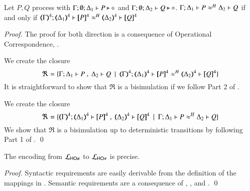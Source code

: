 \begin{proposition}\rm
	\label{prop:fulla:pHOp_to_HOp}
	Let $P, Q$ \pHOp process with $\Gamma; \emptyset; \Delta_1 \vdash P \triangleright \diamond$ and 
	$\Gamma; \emptyset; \Delta_2 \vdash Q \triangleright \diamond$.
	$\Gamma; \Delta_1 \vdash P \approx^{H} \Delta_2 \vdash Q$ if and only if $\horel{\tmap{\Gamma}{4}}{\tmap{\Delta_1}{4}}{\pmap{P}{4}}{\wb}{\tmap{\Delta_2}{4}}{\pmap{Q}{4}}$
\end{proposition}

\begin{proof}
	The proof for both direction is a consequence of Operational Correspondence,
	.


	\noi We create the closure
%
	\[
		\Re = \set{\horel{\Gamma}{\Delta_1}{P}{\ ,\ }{\Delta_2}{Q} \setbar \horel{\tmap{\Gamma}{4}}{\tmap{\Delta_1}{4}}{\pmap{P}{4}}{\wb}{\tmap{\Delta_2}{4}}{\pmap{Q}{4}}}
	\]
%
	\noi	It is straightforward to show that $\Re$ is a bisimulation if we follow Part 2 of
		.


	\noi We create the closure
%
	\[
		\Re = \set{\horel{\tmap{\Gamma}{4}}{\tmap{\Delta_1}{4}}{\pmap{P}{4}}{\ ,\ }{\tmap{\Delta_2}{4}}{\pmap{Q}{4}} \setbar \horel{\Gamma}{\Delta_1}{P}{\wb}{\Delta_2}{Q}}
	\]
%
	\noi	We show that $\Re$ is a bisimulation up to deterministic transitions
		by following Part 1 of .
	\qed
\end{proof}

\begin{proposition}\rm
	\label{prop:prec:pHOp_to_HOp}
	The encoding from $\tyl{L}_{\pHOp}$ to $\mathcal{L}_{\mathsf{HO}\pi}$
	is precise.
\end{proposition}

\begin{proof}
	Syntactic requirements are easily derivable from the
	definition of the mappings in .
	Semantic requirements are a consequence of
	, , and .
	\qed
\end{proof}

